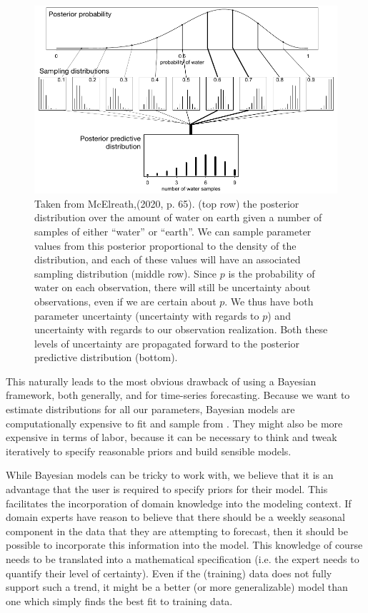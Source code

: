 \documentclass{article}
\begin{document}
\begin{figure}[H]
    \centerline{\includegraphics[scale = 0.5]{images/McElreath.png}}
    \caption{Taken from McElreath,(2020, p. 65). (top row) the posterior distribution over the amount of water on earth given a number of samples of either “water” or “earth”. We can sample parameter values from this posterior proportional to the density of the distribution, and each of these values will have an associated sampling distribution (middle row). Since $p$ is the probability of water on each observation, there will still be uncertainty about observations, even if we are certain about $p$. We thus have both parameter uncertainty (uncertainty with regards to $p$) and uncertainty with regards to our observation realization. Both these levels of uncertainty are propagated forward to the posterior predictive distribution (bottom).}
\end{figure}

\noindent This naturally leads to the most obvious drawback of using a Bayesian framework, both generally, and for time-series forecasting. Because we want to estimate distributions for all our parameters, Bayesian models are computationally expensive to fit and sample from \cite[p.~13]{McElreath}. They might also be more expensive in terms of labor, because it can be necessary to think and tweak iteratively to specify reasonable priors and build sensible models.

\noindent While Bayesian models can be tricky to work with, we believe that it is an advantage that the user is required to specify priors for their model. This facilitates the incorporation of domain knowledge into the modeling context. If domain experts have reason to believe that there should be a weekly seasonal component in the data that they are attempting to forecast, then it should be possible to incorporate this information into the model. This knowledge of course needs to be translated into a mathematical specification (i.e. the expert needs to quantify their level of certainty). Even if the (training) data does not fully support such a trend, it might be a better (or more generalizable) model than one which simply finds the best fit to training data. 
\end{document}

